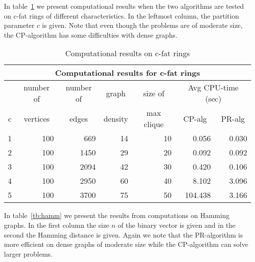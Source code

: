 In table~\ref{tb:cfat} we present computational results when the two algorithms
are tested on c-fat rings of different characteristics. In the leftmost column,
the partition parameter $c$ is given. Note that even though the problems are
of moderate size, the CP-algorithm has some difficulties with dense graphs.

\begin{table}[tbh]
\centering
\scriptsize
\begin{tabular}{||r|r|r|r|r|r|r||}
\hline
\multicolumn{7}{|c|}{Computational results for c-fat rings} \\
\hline \hline
& \multicolumn{1}{c|}{number of} &
\multicolumn{1}{c|}{number of} &
\multicolumn{1}{c|}{graph} &
\multicolumn{1}{c|}{size of} &
\multicolumn{2}{c|}{Avg CPU-time {\tiny (sec)}} \\ \cline{6-7}
\multicolumn{1}{||c|}{c} &
\multicolumn{1}{|c|}{vertices} &
\multicolumn{1}{|c|}{edges} &
\multicolumn{1}{|c|}{density} & 
\multicolumn{1}{|c|}{max clique} &
\multicolumn{1}{|c|}{CP-alg} &
\multicolumn{1}{|c||}{PR-alg} \\
\hline
1 & 100 & 669 & 14 & 10 & 0.056 & 0.030\\
2 & 100 & 1450 & 29 & 20 & 0.092 & 0.092 \\
3 & 100 & 2094 & 42 & 30 & 0.420 & 0.106 \\ 
4 & 100 & 2950 & 60 & 40 & 8.102 & 3.096 \\ 
5 & 100 & 3700 & 75 & 50 & 104.438 & 3.166 \\ 
\hline
\end{tabular}
\caption{Computational results on c-fat rings}
\label{tb:cfat}
\end{table}

In table~\ref{tb:hamm} we present the results from computations on
Hamming graphs. In the first column the size $n$ of the binary vector
is given and in the second the Hamming distance is given. Again we note that
the PR-algorithm is more efficient on dense graphs of moderate size while the
CP-algorithm can solve larger problems.

